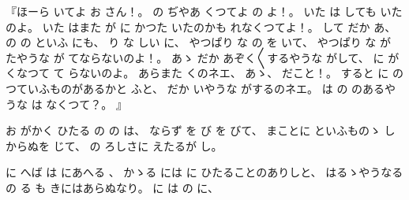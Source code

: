 %
『ほーら
いてよ
お
さん！。
%
の
ぢやあ
くつてよ
の
よ！。
%
いた
は
しても
いたのよ。
%
いた
はまた
が
に
かつた
いたのかも
れなくつてよ！。
%
して
だか
あ、
%
の
の
といふ
にも、
%
り
な
しい
に、
%
やつぱり
な
の
を
いて、
%
やつぱり
な
が
たやうな
が
てならないのよ！。
%
あゝ
だか
あぞく〳〵するやうな
がして、
%
に
が
くなつて
て
らないのよ。
%
あらまた
くのネエ、
%
あゝ、
%
だこと！。
%
すると
に
の
つていふものがあるかと
ふと、
%
だか
いやうな
がするのネエ。
%
は
の
のあるやうな
は
なくつて？。
』

%
お
がかく
ひたる
の
の
は、
%
ならず
を
び
を
びて、
%
まことに
といふものゝ
しからぬを
じて、
%
の
ろしさに
えたるが
し。

%
に
へば
は
にあへる
、
%
かゝる
には
に
ひたることのありしと、
%
はるゝやうなる
の
る
も
きにはあらぬなり。
%
に
は
の
に、

